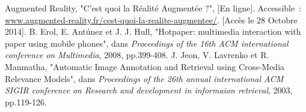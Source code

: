 \documentclass[a4paper]{article}
\begin{document}
\begin{thebibliography}{1}
	 Augmented Reality, "C'est quoi la Réalité Augmentée ?", [En ligne]. Accessible~: \url{www.augmented-reality.fr/cest-quoi-la-realite-augmentee/}. [Accès le 28 Octobre 2014].
	 B. Erol, E. Ant\'unez et J. J. Hull, "Hotpaper: multimedia interaction with paper using mobile phones", dans \textit{Proceedings of the 16th ACM international conference on Multimedia}, 2008, pp.399-408.
	 J. Jeon, V. Lavrenko et R. Manmatha, "Automatic Image Annotation and Retrieval using Cross-Media Relevance Models", dans \textit{Proceedings of the 26th annual international ACM SIGIR conference on Research and development in informaion retrieval}, 2003, pp.119-126.
\end{thebibliography}
\end{document}
